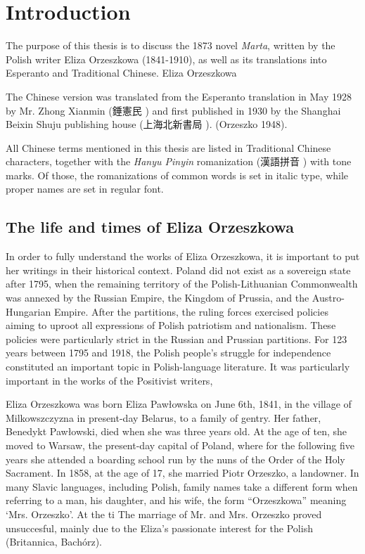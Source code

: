 \chapter{Introduction}

The purpose of this thesis is to discuss the 1873 novel \textit{Marta}, written by the Polish writer Eliza Orzeszkowa (1841-1910), as well as its translations into Esperanto and Traditional Chinese.
Eliza Orzeszkowa 

The Chinese version was translated from the Esperanto translation in May 1928 by Mr. Zhong Xianmin (錘憲民 ) and first published in 1930 by the Shanghai Beixin Shuju publishing house (上海北新書局 ).
(Orzeszko 1948).

All Chinese terms mentioned in this thesis are listed in Traditional Chinese characters, together with the \textit{Hanyu Pinyin} romanization (漢語拼音 ) with tone marks. Of those, the romanizations of common words is set in italic type, while proper names are set in regular font.

\section{The life and times of Eliza Orzeszkowa}

In order to fully understand the works of Eliza Orzeszkowa, it is important to put her writings in their historical context.
Poland did not exist as a sovereign state after 1795, when the remaining territory of the Polish-Lithuanian Commonwealth was annexed by the Russian Empire, the  Kingdom of Prussia, and the Austro-Hungarian Empire.
After the partitions, the ruling forces exercised policies aiming to uproot all expressions of Polish patriotism and nationalism. These policies were particularly strict in the Russian and Prussian partitions.
For 123 years between 1795 and 1918, the Polish people's struggle for independence constituted an important topic in Polish-language literature.
It was particularly important in the works of the Positivist writers, 

Eliza Orzeszkowa was born Eliza Pawłowska on June 6th, 1841, in the village of Milkowszczyzna in present-day Belarus, to a family of gentry. Her father, Benedykt Pawłowski, died when she was three years old. 
At the age of ten, she moved to Warsaw, the present-day capital of Poland, where for the following five years she attended a boarding school run by the nuns of the Order of the Holy Sacrament.
In 1858, at the age of 17, she married Piotr Orzeszko, a landowner. In many Slavic languages, including Polish, family names take a different form when referring to a man, his daughter, and his wife, the form ``Orzeszkowa'' meaning `Mrs. Orzeszko'.
At the ti
The marriage of Mr. and Mrs. Orzeszko proved unsuccesful, mainly due to the Eliza's passionate interest for the Polish 
(Britannica, Bachórz).

